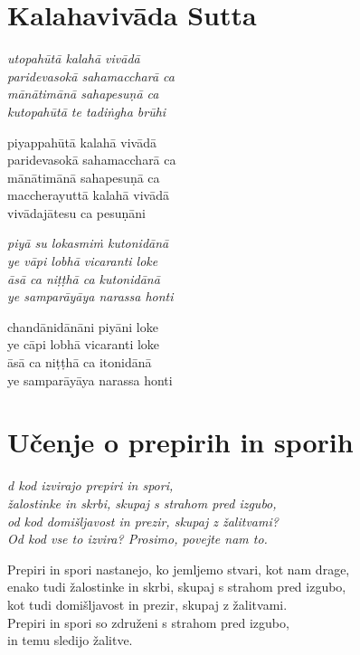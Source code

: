 

\cleartoverso
\chapter*{Kalahavivāda Sutta}

\emph{utopahūtā kalahā vivādā\\
paridevasokā sahamaccharā ca\\
mānātimānā sahapesuṇā ca\\
kutopahūtā te tadiṅgha brūhi}

piyappahūtā kalahā vivādā\\
paridevasokā sahamaccharā ca\\
mānātimānā sahapesuṇā ca\\
maccherayuttā kalahā vivādā\\
vivādajātesu ca pesuṇāni

\emph{piyā su lokasmiṁ kutonidānā\\
ye vāpi lobhā vicaranti loke}\\
\emph{āsā ca niṭṭhā ca kutonidānā\\
ye samparāyāya narassa honti}

chandānidānāni piyāni loke\\
ye cāpi lobhā vicaranti loke\\
āsā ca niṭṭhā ca itonidānā\\
ye samparāyāya narassa honti


\cleartorecto
\chapter{Učenje o prepirih in sporih}

\emph{d kod izvirajo prepiri in spori,\\
žalostinke in skrbi, skupaj s strahom pred izgubo,\\
od kod domišljavost in prezir, skupaj z žalitvami?\\
Od kod vse to izvira? Prosimo, povejte nam to.}

Prepiri in spori nastanejo, ko jemljemo stvari, kot nam drage,\\
enako tudi žalostinke in skrbi, skupaj s strahom pred izgubo,\\
kot tudi domišljavost in prezir, skupaj z žalitvami.\\
Prepiri in spori so združeni s strahom pred izgubo,\\
in temu sledijo žalitve.

